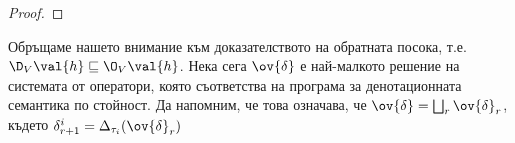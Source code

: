 \begin{proof}
  
\end{proof}


Обръщаме нашето внимание към доказателството на обратната посока, т.е. $\D_V\val{h} \sqsubseteq \O_V\val{h}$. 
Нека сега $\ov{\delta}$ е най-малкото решение на системата от оператори, която съответства на програма 
за денотационната семантика по стойност.
Да напомним, че това означава, че $\ov{\delta} = \bigsqcup_r \ov{\delta}_r$, 
където $\delta^i_{r+1} = \Delta_{\tau_i}(\ov{\delta}_r)$

